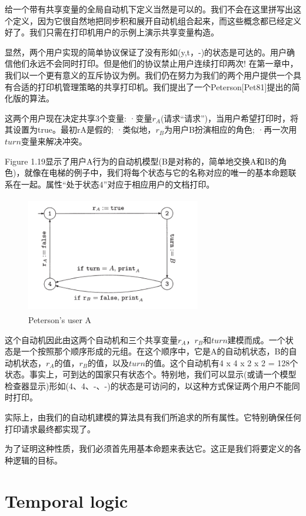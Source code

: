 \documentclass{book}
\begin{document}
    给一个带有共享变量的全局自动机下定义当然是可以的。我们不会在这里拼写出这个定义，因为它很自然地把同步积和展开自动机组合起来，而这些概念都已经定义好了。我们只需在打印机用户的示例上演示共享变量构造。

    显然，两个用户实现的简单协议保证了没有形如(y,t，-)的状态是可达的。用户确信他们永远不会同时打印。但是他们的协议禁止用户连续打印两次!
    在第一章中，我们以一个更有意义的互斥协议为例。我们仍在努力为我们的两个用户提供一个具有合适的打印机管理策略的共享打印机。我们提出了一个Peterson[Pet81]提出的简化版的算法。

    这两个用户现在决定共享3个变量:
    ·变量$r_A$(请求“请求”)，当用户希望打印时，将其设置为true。最初rA是假的;
    ·类似地，$r_B$为用户B扮演相应的角色;
    ·再一次用$turn$变量来解决冲突。

    Figure 1.19显示了用户A行为的自动机模型(B是对称的，简单地交换A和B的角色)，就像在电梯的例子中，我们将每个状态与它的名称对应的唯一的基本命题联系在一起。属性“处于状态4”对应于相应用户的文档打印。
    \begin{figure}
    \centering
    \includegraphics[height=2in,width=3.0in]{1_19.png}
    \caption{Peterson's user A}
    \end{figure}

    这个自动机因此由这两个自动机和三个共享变量$r_A$，$r_B$和$turn$建模而成。一个状态是一个按照那个顺序形成的元组。在这个顺序中，它是A的自动机状态，B的自动机状态，$r_A$的值，$r_B$的值，以及$turn$的值。这个自动机有4 x 4 x 2 x 2 = 128个状态。事实上，可到达的国家只有状态个。特别地，我们可以显示(或请一个模型检查器显示)形如(4、4、-、-)的状态是可访问的，以这种方式保证两个用户不能同时打印。

    实际上，由我们的自动机建模的算法具有我们所追求的所有属性。它特别确保任何打印请求最终都实现了。

    为了证明这种性质，我们必须首先用基本命题来表达它。这正是我们将要定义的各种逻辑的目标。


    \chapter{Temporal logic}
\end{document}
